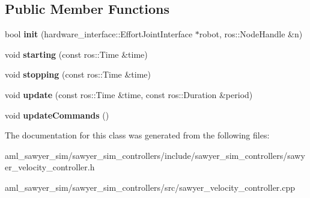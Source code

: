\subsection*{Public Member Functions}
\begin{DoxyCompactItemize}
\item 
\hypertarget{classsawyer__sim__controllers_1_1_sawyer_velocity_controller_adb2c1dcb5a1d0e36f5a462cd04091abe}{bool {\bfseries init} (hardware\-\_\-interface\-::\-Effort\-Joint\-Interface $\ast$robot, ros\-::\-Node\-Handle \&n)}\label{classsawyer__sim__controllers_1_1_sawyer_velocity_controller_adb2c1dcb5a1d0e36f5a462cd04091abe}

\item 
\hypertarget{classsawyer__sim__controllers_1_1_sawyer_velocity_controller_a2a01ce0fee6f0b4c8f4b917fbb556e35}{void {\bfseries starting} (const ros\-::\-Time \&time)}\label{classsawyer__sim__controllers_1_1_sawyer_velocity_controller_a2a01ce0fee6f0b4c8f4b917fbb556e35}

\item 
\hypertarget{classsawyer__sim__controllers_1_1_sawyer_velocity_controller_a745b50d58bd861fe5e24b1909a062c79}{void {\bfseries stopping} (const ros\-::\-Time \&time)}\label{classsawyer__sim__controllers_1_1_sawyer_velocity_controller_a745b50d58bd861fe5e24b1909a062c79}

\item 
\hypertarget{classsawyer__sim__controllers_1_1_sawyer_velocity_controller_a72c264798584174cc28fd70a0355b3f5}{void {\bfseries update} (const ros\-::\-Time \&time, const ros\-::\-Duration \&period)}\label{classsawyer__sim__controllers_1_1_sawyer_velocity_controller_a72c264798584174cc28fd70a0355b3f5}

\item 
\hypertarget{classsawyer__sim__controllers_1_1_sawyer_velocity_controller_a95a4e763937f8421a85f4d1a02cfd812}{void {\bfseries update\-Commands} ()}\label{classsawyer__sim__controllers_1_1_sawyer_velocity_controller_a95a4e763937f8421a85f4d1a02cfd812}

\end{DoxyCompactItemize}


The documentation for this class was generated from the following files\-:\begin{DoxyCompactItemize}
\item 
aml\-\_\-sawyer\-\_\-sim/sawyer\-\_\-sim\-\_\-controllers/include/sawyer\-\_\-sim\-\_\-controllers/sawyer\-\_\-velocity\-\_\-controller.\-h\item 
aml\-\_\-sawyer\-\_\-sim/sawyer\-\_\-sim\-\_\-controllers/src/sawyer\-\_\-velocity\-\_\-controller.\-cpp\end{DoxyCompactItemize}
